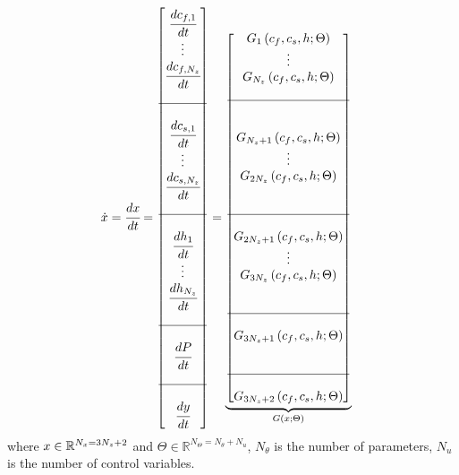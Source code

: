 \documentclass[../Article_Model_Parameters.tex]{subfiles}
\begin{document}
				{\footnotesize
					\begin{align*} \label{discretization}
						\dot{x} &= \cfrac{d x}{d t} = 
						\begin{bmatrix}
							\cfrac{d c_{f,1}}{d t} 	  \\
							\vdots					  \\
							\cfrac{d c_{f,N_z}}{d t} \\
							\\ \hline \\
							\cfrac{d c_{s,1}}{d t} 	  \\
							\vdots					  \\
							\cfrac{d c_{s,N_z}}{d t} \\
							\\ \hline \\
							\cfrac{d h_1}{d t} 	  \\
							\vdots 					  \\
							\cfrac{d h_{N_z}}{d t} \\
							\\ \hline \\
							\cfrac{d P}{d t} \\
							\\ \hline \\
							\cfrac{d y}{d t}
						\end{bmatrix}
						=
						\underbrace{\begin{bmatrix}
								G_1 \left( c_f,c_s,h; \Theta \right)\\ 
								\vdots\\ 
								G_{N_z} \left( c_f,c_s,h; \Theta \right)\\ 
								\\ \hline \\ \\
								G_{N_z+1} \left( c_f,c_s,h; \Theta \right)\\ 
								\vdots\\
								G_{2N_z} \left( c_f,c_s,h; \Theta \right)\\ 
								\\ \\ \hline \\ 
								G_{2N_z+1} \left( c_f,c_s,h; \Theta \right) \\
								\vdots\\
								G_{3N_z} \left( c_f,c_s,h; \Theta \right) \\ 
								\\ \\ \hline \\
								G_{3N_z+1} \left( c_f,c_s,h; \Theta \right) \\
								\\ \\ \hline \\
								G_{3N_z+2} \left( c_f,c_s,h; \Theta \right) 
						\end{bmatrix}}_{G \left( x; \Theta \right)} 
				\end{align*} }
			where ${\color{black}x} \in \mathbb{R}^{N_x = 3N_z+2} $ and $\Theta \in \mathbb{R}^{N_\Theta =  N_{\theta} + N_u } $, $N_{\theta}$ is the number of parameters, $N_{u}$ is the number of control variables.
			
\end{document}
